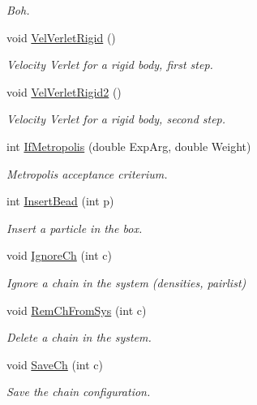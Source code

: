 \begin{DoxyCompactItemize}
\begin{DoxyCompactList}\small\item\em \-Boh. \end{DoxyCompactList}\item 
void \hyperlink{classForces_a050e80ecdb61ccf749649d6ec6542ee7}{\-Vel\-Verlet\-Rigid} ()
\begin{DoxyCompactList}\small\item\em \-Velocity \-Verlet for a rigid body, first step. \end{DoxyCompactList}\item 
void \hyperlink{classForces_a3d421e17e32ee064077a14cc483a7c4e}{\-Vel\-Verlet\-Rigid2} ()
\begin{DoxyCompactList}\small\item\em \-Velocity \-Verlet for a rigid body, second step. \end{DoxyCompactList}\item 
int \hyperlink{classForces_a8b42f5fd80b4ad0cbf71649cd58f17ef}{\-If\-Metropolis} (double \-Exp\-Arg, double \-Weight)
\begin{DoxyCompactList}\small\item\em \-Metropolis acceptance criterium. \end{DoxyCompactList}\item 
int \hyperlink{classForces_a105420510a35a5f3ab726a943a279ce4}{\-Insert\-Bead} (int p)
\begin{DoxyCompactList}\small\item\em \-Insert a particle in the box. \end{DoxyCompactList}\item 
void \hyperlink{classForces_ada3b7b85ea783d27acfd5ff27165e4e2}{\-Ignore\-Ch} (int c)
\begin{DoxyCompactList}\small\item\em \-Ignore a chain in the system (densities, pairlist) \end{DoxyCompactList}\item 
void \hyperlink{classForces_a93ffd0cd932626a8b09911f2b3c96e10}{\-Rem\-Ch\-From\-Sys} (int c)
\begin{DoxyCompactList}\small\item\em \-Delete a chain in the system. \end{DoxyCompactList}\item 
void \hyperlink{classForces_a69e06a7f5662a462ed7b67428f1a8e69}{\-Save\-Ch} (int c)
\begin{DoxyCompactList}\small\item\em \-Save the chain configuration. \end{DoxyCompactList}\item 

\end{DoxyCompactItemize}
